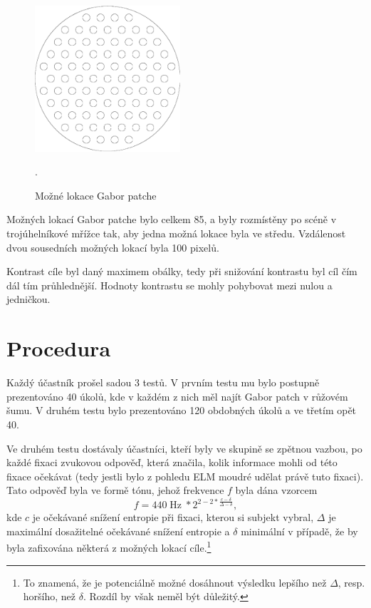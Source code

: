 \begin{figure}
\centering
\includegraphics[width=0.48\textwidth]{img/locations_outline.png}
\caption {Možné lokace Gabor patche}.
\end{figure}

Možných lokací Gabor patche bylo celkem 85, a byly rozmístěny po scéně v
trojúhelníkové mřížce tak, aby jedna možná lokace byla ve středu. Vzdálenost
dvou sousedních možných lokací byla 100 pixelů. 

Kontrast cíle byl daný maximem obálky, tedy při snižování kontrastu byl cíl čím
dál tím průhlednější. Hodnoty kontrastu se mohly pohybovat mezi nulou a
jedničkou.

\section{Procedura}

Každý účastník prošel sadou 3 testů. V prvním testu mu bylo postupně
prezentováno 40 úkolů, kde v každém z nich měl najít Gabor patch v růžovém
šumu.  V druhém testu bylo prezentováno 120 obdobných úkolů a ve třetím opět
40. 

Ve druhém testu dostávaly účastníci, kteří byly ve skupině se zpětnou
vazbou, po každé fixaci zvukovou odpověď, která značila, kolik informace mohli
od této fixace očekávat (tedy jestli bylo z pohledu ELM moudré udělat právě
tuto fixaci). Tato odpověď byla ve formě tónu, jehož frekvence $f$ byla dána
vzorcem $$f = 440\operatorname{Hz}*2^{2-2*\frac{c - \delta}{\Delta -
\delta}},$$ kde $c$ je očekávané snížení entropie při fixaci, kterou si subjekt
vybral, $\Delta$ je maximální dosažitelné očekávané snížení entropie a $\delta$
minimální v případě, že by byla zafixována některá z možných lokací
cíle.\footnote{To znamená, že je potenciálně možné dosáhnout výsledku lepšího
než $\Delta$, resp. horšího, než $\delta$. Rozdíl by však neměl být důležitý.} 

